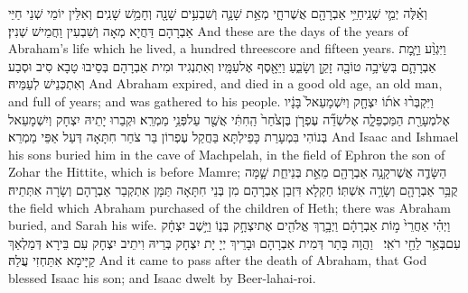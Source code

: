 {וְאֵ֗לֶּה יְמֵ֛י שְׁנֵֽי\maqqaf חַיֵּ֥י אַבְרָהָ֖ם אֲשֶׁר\maqqaf חָ֑י מְאַ֥ת שָׁנָ֛ה וְשִׁבְעִ֥ים שָׁנָ֖ה וְחָמֵ֥שׁ שָׁנִֽים׃}
{וְאִלֵּין יוֹמֵי שְׁנֵי חַיֵּי אַבְרָהָם דַּחֲיָא מְאָה וְשִׁבְעִין וַחֲמֵישׁ שְׁנִין׃}
{And these are the days of the years of Abraham’s life which he lived, a hundred threescore and fifteen years.}{}
{וַיִּגְוַ֨ע וַיָּ֧מׇת אַבְרָהָ֛ם בְּשֵׂיבָ֥ה טוֹבָ֖ה זָקֵ֣ן וְשָׂבֵ֑עַ וַיֵּאָ֖סֶף אֶל\maqqaf עַמָּֽיו׃}
{וְאִתְנְגִיד וּמִית אַבְרָהָם בְּסֵיבוּ טָבָא סִיב וּסְבַע וְאִתְכְּנֵישׁ לְעַמֵּיהּ׃}
{And Abraham expired, and died in a good old age, an old man, and full of years; and was gathered to his people.}{}
{וַיִּקְבְּר֨וּ אֹת֜וֹ יִצְחָ֤ק וְיִשְׁמָעֵאל֙ בָּנָ֔יו אֶל\maqqaf מְעָרַ֖ת הַמַּכְפֵּלָ֑ה אֶל\maqqaf שְׂדֵ֞ה עֶפְרֹ֤ן בֶּן\maqqaf צֹ֙חַר֙ הַֽחִתִּ֔י אֲשֶׁ֖ר עַל\maqqaf פְּנֵ֥י מַמְרֵֽא׃}
{וּקְבַרוּ יָתֵיהּ יִצְחָק וְיִשְׁמָעֵאל בְּנוֹהִי בִּמְעָרַת כָּפֵילְתָּא בַּחֲקַל עֶפְרוֹן בַּר צֹחַר חִתָּאָה דְּעַל אַפֵּי מַמְרֵא׃}
{And Isaac and Ishmael his sons buried him in the cave of Machpelah, in the field of Ephron the son of Zohar the Hittite, which is before Mamre;}{}
{הַשָּׂדֶ֛ה אֲשֶׁר\maqqaf קָנָ֥ה אַבְרָהָ֖ם מֵאֵ֣ת בְּנֵי\maqqaf חֵ֑ת שָׁ֛מָּה קֻבַּ֥ר אַבְרָהָ֖ם וְשָׂרָ֥ה אִשְׁתּֽוֹ׃}
{חַקְלָא דִּזְבַן אַבְרָהָם מִן בְּנֵי חִתָּאָה תַּמָּן אִתְקְבַר אַבְרָהָם וְשָׂרָה אִתְּתֵיהּ׃}
{the field which Abraham purchased of the children of Heth; there was Abraham buried, and Sarah his wife.}{}
{וַיְהִ֗י אַחֲרֵי֙ מ֣וֹת אַבְרָהָ֔ם וַיְבָ֥רֶךְ אֱלֹהִ֖ים אֶת\maqqaf יִצְחָ֣ק בְּנ֑וֹ וַיֵּ֣שֶׁב יִצְחָ֔ק עִם\maqqaf בְּאֵ֥ר לַחַ֖י רֹאִֽי׃ \petucha }
{וַהֲוָה בָּתַר דְּמִית אַבְרָהָם וּבָרֵיךְ יְיָ יָת יִצְחָק בְּרֵיהּ וִיתֵיב יִצְחָק עִם בֵּירָא דְּמַלְאַךְ קַיָּימָא אִתַּחְזִי עֲלַהּ׃}
{And it came to pass after the death of Abraham, that God blessed Isaac his son; and Isaac dwelt by Beer-lahai-roi.}{}
